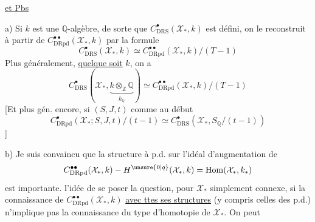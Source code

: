 \uline{ et Pbs}

a) Si $k$ est une $\mathbb Q$-algèbre, de sorte que $C^\bullet_{\mathrm{DRS}}(\mathcal X_*,k)$ est défini, on le reconstruit à partir de $C^{\bullet\bullet}_{\mathrm{DRpd}}(\mathcal X_*,k)$  par la formule
\[
C^\bullet_{\mathrm{DRS}}(\mathcal X_*,k)\simeq C^{\bullet\bullet}_{\mathrm{DRpd}}(\mathcal X_*,k)/(T-1)
\]
Plus généralement, \uline{quelque soit} $k$, on a
\[
C^\bullet_{\mathrm{DRS}}(\mathcal X_*,\underbrace{k\otimes_{\mathbb Z}\mathbb Q}_{k_{\mathbb Q}})\simeq C^{\bullet\bullet}_{\mathrm{DRpd}}(\mathcal X_*,k)/(T-1)
\]
[Et plus gén. encore, si $(S,J,t)$ comme au début
\[
C^\bullet_{\mathrm{DRpd}}(\mathcal X_*;S,J,t)/(t-1)\simeq C^\bullet_{\mathrm{DRS}}(\mathcal X_*,S_{\mathbb Q}/(t-1))
\]
]

b) Je suis convaincu que la structure à p.d. sur l'idéal d'augmentation de
\[
C^{\bullet\bullet}_{\mathrm{DRpd}}(\mathcal X_*,k)\mathbin{-}H^{\unsure{0|q}}(\mathcal X_*,k)=\operatorname{Hom}(\mathcal X_*,k_*)
\]
est importante.  l'idée de se poser la question, pour $\mathcal X_*$ simplement connexe,  si la connaissance de $C^{\bullet\bullet}_{\mathrm{DRpd}}(\mathcal X_*,k)$ \uline{avec ttes ses structures} (y compris celles des p.d.) n'implique pas la connaissance du type d'homotopie de $\mathcal X_*$. On peut

